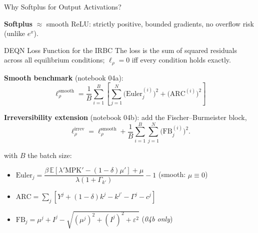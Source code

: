 \documentclass[aspectratio=169,11pt]{beamer}
\newcommand{\emphc}[1]{\textcolor{harvardcrimson}{#1}}
\newcommand{\E}[1]{\mathbb{E}\!\left[#1\right]}
\begin{document}
\begin{frame}{Why Softplus for Output Activations?}
\begin{center}
\end{center}

\vspace{0.2em}
{\small
\textbf{Softplus} $\approx$ smooth ReLU: strictly positive, bounded gradients, no overflow risk (unlike $e^x$).
}
\end{frame}

\begin{frame}{DEQN Loss Function for the IRBC}
\footnotesize
The loss is the \emphc{sum of squared residuals} across all equilibrium conditions; $\ell_\rho = 0$ iff every condition holds exactly.

\vspace{0.15em}
\textbf{Smooth benchmark} (notebook 04a):
\[
\boxed{
\ell^{\mathrm{smooth}}_\rho = \frac{1}{B}\sum_{i=1}^{B} \left[\sum_{j=1}^{N} \bigl(\text{Euler}_j^{(i)}\bigr)^2 + \bigl(\text{ARC}^{(i)}\bigr)^2\right]
}
\]

\vspace{0.1em}
\textbf{Irreversibility extension} (notebook 04b): add the Fischer--Burmeister block,
\[
\ell^{\mathrm{irrev}}_\rho = \ell^{\mathrm{smooth}}_\rho + \frac{1}{B}\sum_{i=1}^{B}\sum_{j=1}^{N}\bigl(\text{FB}_j^{(i)}\bigr)^2.
\]

\vspace{0.1em}
with $B$ the batch size:
\begin{itemize}\itemsep0pt
    \item $\text{Euler}_j = \dfrac{\beta\,\E{\lambda' \text{MPK}' - (1-\delta)\mu'} + \mu}{\lambda(1+\Gamma_{k'})} - 1$ \quad (smooth: $\mu \equiv 0$)
    \item $\text{ARC} = \sum_j [Y^j + (1-\delta)k^j - k^{j\prime} - \Gamma^j - c^j]$
    \item $\text{FB}_j = \mu^j + I^j - \sqrt{(\mu^j)^2 + (I^j)^2 + \varepsilon^2}$ \quad (\emph{04b only})
\end{itemize}
\end{frame}
\end{document}
